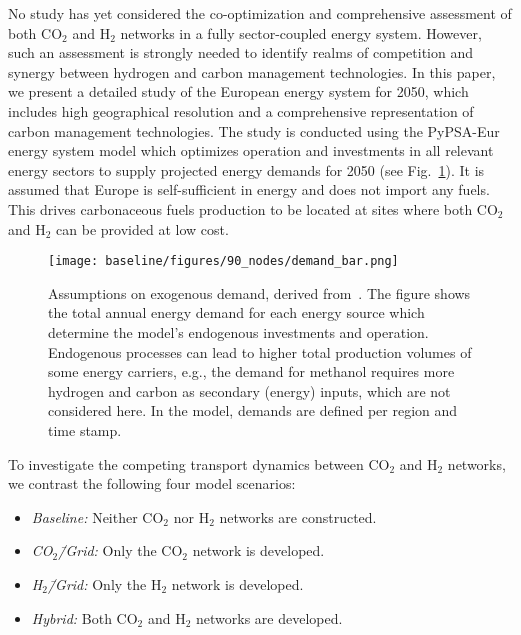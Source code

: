 \documentclass[twocolumn]{article}
\newcommand{\COtwo}{CO$_2$}
\newcommand{\Htwo}{H$_2$}
\newcommand{\COgrid}{CO$_2$\=/Grid}
\newcommand{\Hgrid}{H$_2$\=/Grid}
\newcommand{\carbon}{CO$_2$}
\newcommand{\hydrogen}{H$_2$}
\begin{document}
No study has yet considered the co-optimization and comprehensive assessment of both \COtwo{} and \Htwo{} networks in a fully sector-coupled energy system. However, such an assessment is strongly needed to identify realms of competition and synergy between hydrogen and carbon management technologies. In this paper, we present a detailed study of the European energy system for 2050, which includes high geographical resolution and a comprehensive representation of carbon management technologies. The study is conducted using the PyPSA-Eur energy system model which optimizes operation and investments in all relevant energy sectors to supply projected energy demands for 2050 (see Fig.~\ref{fig:total-demand-bar}). It is assumed that Europe is self-sufficient in energy and does not import any fuels. This drives carbonaceous fuels production to be located at sites where both \carbon{} and \hydrogen{} can be provided at low cost.

\begin{figure}[h!]
    \texttt{[image: baseline/figures/90\_nodes/demand\_bar.png]}
    \caption{Assumptions on exogenous demand, derived from~\cite{piamanzGeoreferencedIndustrialSites2018,muehlenpfordtTimeSeries2019,mantzosJRCIDEES20152018,NationalEmissionsReported2023,EurostatCompleteEnergyBalance,uwekrienDemandlib2023}. The figure shows the total annual energy demand for each energy source which determine the model's endogenous investments and operation. Endogenous processes can lead to higher total production volumes of some energy carriers, e.g., the demand for methanol requires more hydrogen and carbon as secondary (energy) inputs, which are not considered here. In the model, demands are defined per region and time stamp.}
    \label{fig:total-demand-bar}
\end{figure}




To investigate the competing transport dynamics between \COtwo{} and \Htwo{} networks, we contrast the following four model scenarios:
%
\begin{itemize}
    \item[] \textit{Baseline:} Neither \COtwo{} nor \Htwo{} networks are constructed.
    \item[] \textit{\COgrid{}:} Only the \COtwo{} network is developed.
    \item[] \textit{\Hgrid{}:} Only the \Htwo{} network is developed.
    \item[] \textit{Hybrid:} Both \COtwo{} and \Htwo{} networks are developed.
\end{itemize}
\end{document}
